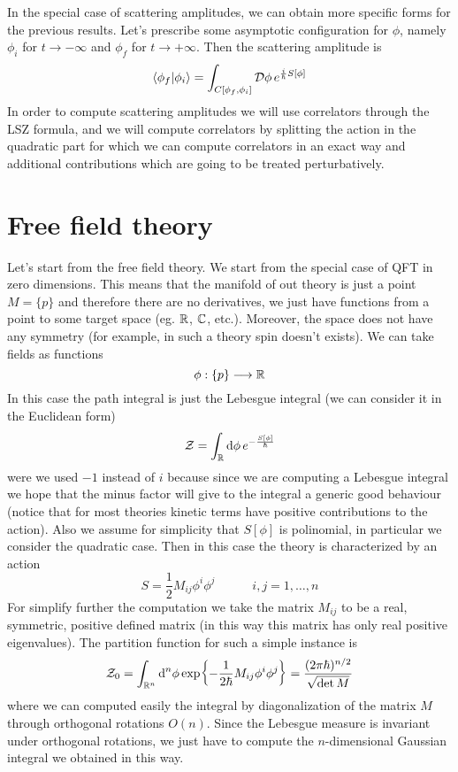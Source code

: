\documentclass[../main/main.tex]{subfiles}
\begin{document}
In the special case of scattering amplitudes, we can obtain more specific forms for the previous results. Let's prescribe some asymptotic configuration for $\phi$, namely $\phi_i$ for $t\to-\infty$ and $\phi_f$ for $t\to+\infty$. Then the scattering amplitude is
\[\braket{\phi_f}{\phi_i}=\int_{C[\phi_f,\phi_i]}\mathcal D\phi\,e^{\frac i\hbar S[\phi]}\]
In order to compute scattering amplitudes we will use correlators through the LSZ formula, and we will compute correlators by splitting the action in the quadratic part for which we can compute correlators in an exact way and additional contributions which are going to be treated perturbatively. 


\section{Free field theory}

Let's start from the free field theory. We start from the special case of QFT in zero dimensions. This means that the manifold of out theory is just a point $M=\{p\}$ and therefore there are no derivatives, we just have functions from a point to some target space (eg. $\mathbb{R}$, $\mathbb{C}$, etc.). Moreover, the space does not have any symmetry (for example, in such a theory spin doesn't exists). We can take fields as functions
\[\phi:\{p\}\longrightarrow\mathbb{R}\]
In this case the path integral is just the Lebesgue integral (we can consider it in the Euclidean form)
\[\mathcal Z=\int_{\mathbb{R}}\textup{d}\phi\,e^{-\frac{S[\phi]}\hbar}\]
were we used $-1$ instead of $i$ because since we are computing a Lebesgue integral we hope that the minus factor will give to the integral a generic good behaviour (notice that for most theories kinetic terms have positive contributions to the action). Also we assume for simplicity that $S[\phi]$ is polinomial, in particular we consider the quadratic case. 
Then in this case the theory is characterized by an action
\[S=\frac12M_{ij}\phi^i\phi^j\qquad\quad i,j=1,\dots,n\]
For simplify further the computation we take the matrix $M_{ij}$ to be a real, symmetric, positive defined matrix (in this way this matrix has only real positive eigenvalues).
The partition function for such a simple instance is 
\begin{equation}\label{eqn:part-func-free-0D}
\mathcal Z_0=\int_{\mathbb{R}^n}\textup{d}^n\phi \exp{-\frac1{2\hbar}M_{ij}\phi^i\phi^j}=\frac{(2\pi\hbar)^{n/2}}{\sqrt{\det M}}
\end{equation}
where we can computed easily the integral by diagonalization of the matrix $M$ through orthogonal rotations $O(n)$. Since the Lebesgue measure is invariant under orthogonal rotations, we just have to compute the $n$-dimensional Gaussian integral we obtained in this way. 
\end{document}
